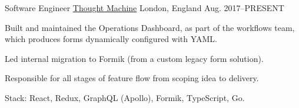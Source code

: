 
\begin{cventries}

  \cventry
  {Software Engineer}
  {\href{https://www.thoughtmachine.net/}{Thought Machine}}
  {London, England}
  {Aug. 2017--\textsc{PRESENT}}
  {
    \begin{cvitems}
      \item Built and maintained the Operations Dashboard, as part of the workflows team, which produces forms dynamically configured with YAML.
      \item Led internal migration to Formik (from a custom legacy form solution).
      \item Responsible for all stages of feature flow from scoping idea to delivery.
      \item Stack: React, Redux, GraphQL (Apollo), Formik, TypeScript, Go.
    \end{cvitems}
  }
  {}


\end{cventries}
